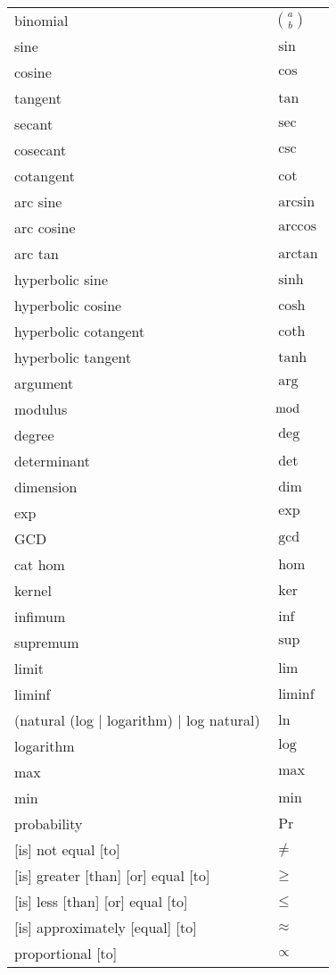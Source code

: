 \documentclass[12pt, a4paper]{article}
\begin{document}
\begin{longtable}{ll}
binomial & $\binom{a}{b}$ \\
sine & $\sin$ \\
cosine & $\cos$ \\
tangent & $\tan$ \\
secant & $\sec$ \\
cosecant & $\csc$ \\
cotangent & $\cot$ \\
arc sine & $\arcsin$ \\
arc cosine & $\arccos$ \\
arc tan & $\arctan$ \\
hyperbolic sine & $\sinh$ \\
hyperbolic cosine & $\cosh$ \\
hyperbolic cotangent & $\coth$ \\
hyperbolic tangent & $\tanh$ \\
argument & $\arg$ \\
modulus & $\bmod$ \\
degree & $\deg$ \\
determinant & $\det$ \\
dimension & $\dim$ \\
exp & $\exp$ \\
GCD & $\gcd$ \\
cat hom & $\hom$ \\
kernel & $\ker$ \\
infimum & $\inf$ \\
supremum & $\sup$ \\
limit & $\lim$ \\
liminf & $\liminf$ \\
(natural (log | logarithm) | log natural) & $\ln$ \\
logarithm & $\log$ \\
max & $\max$ \\
min & $\min$ \\
probability & $\Pr$ \\
{[is]} not equal [to] & $\neq$ \\
{[is]} greater [than] [or] equal [to] & $\geq$ \\
{[is]} less [than] [or] equal [to] & $\leq$ \\
{[is]} approximately [equal] [to] & $\approx$ \\
proportional [to] & $\propto$ \\

\end{longtable}
\end{document}
